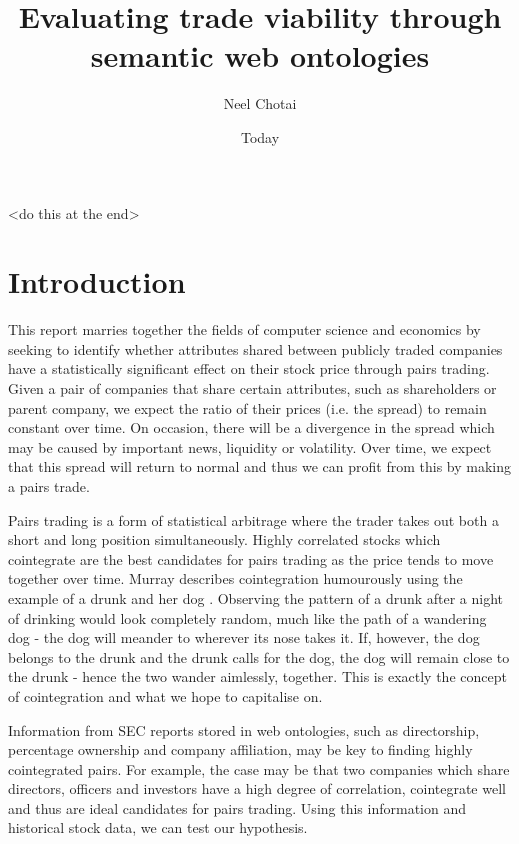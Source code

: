 \documentclass{UoYCSproject}
\author{Neel Chotai}
\title{Evaluating trade viability through semantic web ontologies}
\date{Today}
\begin{document}
\maketitle
\listoffigures
\listoftables

\begin{summary}
<do this at the end>
\end{summary}

\chapter{Introduction}
\label{cha:Introduction}

This report marries together the fields of computer science and economics by seeking to identify whether attributes shared between publicly traded companies have a statistically significant effect on their stock price through pairs trading. Given a pair of companies that share certain attributes, such as shareholders or parent company, we expect the ratio of their prices (i.e. the spread) to remain constant over time. On occasion, there will be a divergence in the spread which may be caused by important news, liquidity or volatility. Over time, we expect that this spread will return to normal and thus we can profit from this by making a pairs trade.

Pairs trading is a form of statistical arbitrage where the trader takes out both a short and long position simultaneously. Highly correlated stocks which cointegrate are the best candidates for pairs trading as the price tends to move together over time. Murray describes cointegration humourously using the example of a drunk and her dog \parencite{drunkdog}. Observing the pattern of a drunk after a night of drinking would look completely random, much like the path of a wandering dog - the dog will meander to wherever its nose takes it. If, however, the dog belongs to the drunk and the drunk calls for the dog, the dog will remain close to the drunk - hence the two wander aimlessly, together. This is exactly the concept of cointegration and what we hope to capitalise on.

Information from SEC reports stored in web ontologies, such as directorship, percentage ownership and company affiliation, may be key to finding highly cointegrated pairs. For example, the case may be that two companies which share directors, officers and investors have a high degree of correlation, cointegrate well and thus are ideal candidates for pairs trading. Using this information and historical stock data, we can test our hypothesis.
\end{document}
